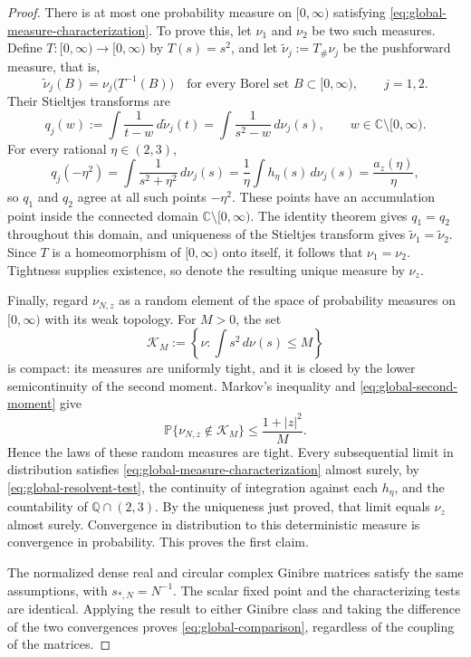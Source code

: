 \documentclass[11pt,reqno]{amsart}
\numberwithin{equation}{section}
\theoremstyle{plain}
\theoremstyle{definition}
\theoremstyle{remark}
\begin{document}
\begin{proof}
There is at most one probability measure on $[0,\infty)$ satisfying
\eqref{eq:global-measure-characterization}. To prove this, let $\nu_1$
and $\nu_2$ be two such measures. Define $T:[0,\infty)\to[0,\infty)$
by $T(s)=s^2$, and let $\widetilde\nu_j:=T_\#\nu_j$ be the
pushforward measure, that is,
\[
 \widetilde\nu_j(B)=\nu_j\bigl(T^{-1}(B)\bigr)
 \quad\text{for every Borel set }B\subset[0,\infty),\qquad j=1,2.
\]
Their Stieltjes transforms are
\[
 q_j(w):=\int\frac1{t-w}\,d\widetilde\nu_j(t)
       =\int\frac1{s^2-w}\,d\nu_j(s),
 \qquad w\in\mathbb C\setminus[0,\infty).
\]
For every rational $\eta\in(2,3)$,
\[
 q_j(-\eta^2)=\int\frac1{s^2+\eta^2}\,d\nu_j(s)
 =\frac1\eta\int h_\eta(s)\,d\nu_j(s)
 =\frac{a_z(\eta)}\eta,
\]
so $q_1$ and $q_2$ agree at all such points $-\eta^2$. These points
have an accumulation point inside the connected domain
$\mathbb C\setminus[0,\infty)$. The identity theorem gives $q_1=q_2$
throughout this domain, and uniqueness of the Stieltjes transform gives
$\widetilde\nu_1=\widetilde\nu_2$. Since $T$ is a homeomorphism of
$[0,\infty)$ onto itself, it follows that $\nu_1=\nu_2$.
Tightness supplies existence, so denote the resulting unique measure by
$\nu_z$.

Finally, regard $\nu_{N,z}$ as a random element of the space of probability
measures on $[0,\infty)$ with its weak topology.  For $M>0$, the set
\[
 \mathcal K_M:=\left\{\nu:\int s^2\,d\nu(s)\le M\right\}
\]
is compact: its measures are uniformly tight, and it is closed by the
lower semicontinuity of the second moment.  Markov's inequality and
\eqref{eq:global-second-moment} give
\[
 \mathbb P\{\nu_{N,z}\notin\mathcal K_M\}
 \le\frac{1+|z|^2}{M}.
\]
Hence the laws of these random measures are tight.  Every subsequential
limit in distribution satisfies
\eqref{eq:global-measure-characterization} almost surely, by
\eqref{eq:global-resolvent-test}, the continuity of integration against
each $h_\eta$, and the countability of $\mathbb Q\cap(2,3)$.  By the
uniqueness just proved, that limit equals $\nu_z$ almost surely.
Convergence in distribution to this deterministic measure is convergence
in probability.  This proves the first claim.

The normalized dense real and circular complex Ginibre matrices satisfy
the same assumptions, with $s_{*,N}=N^{-1}$.  The scalar fixed point and
the characterizing tests are identical.  Applying the result to either
Ginibre class and taking the difference of the two convergences proves
\eqref{eq:global-comparison}, regardless of the coupling of the matrices.
\end{proof}
\end{document}
